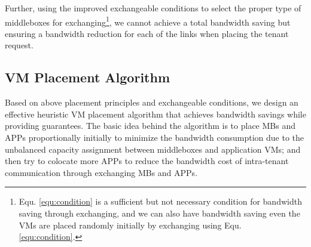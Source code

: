 \documentclass[review]{elsarticle}
\begin{document}
Further, using the improved exchangeable conditions to select the proper type of middleboxes for exchanging\footnote{Equ. \ref{equ:condition} is a sufficient but not necessary condition for bandwidth saving through exchanging, and we can also have bandwidth saving even the VMs are placed randomly initially by exchanging using Equ. \ref{equ:condition}.},
we cannot achieve a total bandwidth saving but ensuring a bandwidth reduction for each of the links when placing the tenant request.


\subsection{VM Placement Algorithm}

Based on above placement principles and exchangeable conditions, we design an effective heuristic VM placement algorithm that achieves bandwidth savings while providing guarantees. The basic idea behind the algorithm is to place MBs and APPs proportionally initially to minimize the bandwidth consumption due to the unbalanced capacity assignment between middleboxes and application VMs; and then try to colocate more APPs to reduce the bandwidth cost of intra-tenant communication through exchanging MBs and APPs. 
\end{document}
